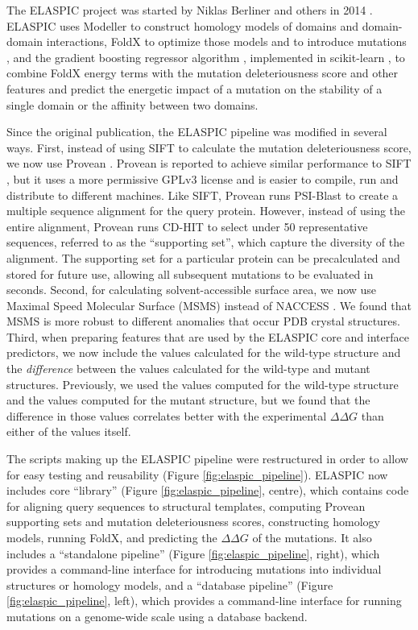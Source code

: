 The ELASPIC project was started by Niklas Berliner and others in 2014 \cite{berliner_combining_2014}. ELASPIC uses Modeller \cite{webb_comparative_2002} to construct homology models of domains and domain-domain interactions, FoldX to optimize those models and to introduce mutations \cite{schymkowitz_foldx_2005}, and the gradient boosting regressor algorithm \cite{berliner_combining_2014}, implemented in scikit-learn \cite{scikit-learn}, to combine FoldX energy terms with the mutation deleteriousness score and other features and predict the energetic impact of a mutation on the stability of a single domain or the affinity between two domains.

Since the original publication, the ELASPIC pipeline was modified in several ways. First, instead of using SIFT \cite{ng_sift:_2003} to calculate the mutation deleteriousness score, we now use Provean \cite{choi_predicting_2012}. Provean is reported to achieve similar performance to SIFT \cite{choi_predicting_2012}, but it uses a more permissive GPLv3 license and is easier to compile, run and distribute to different machines. Like SIFT, Provean runs PSI-Blast to create a multiple sequence alignment for the query protein. However, instead of using the entire alignment, Provean runs CD-HIT to select under 50 representative sequences, referred to as the ``supporting set'', which capture the diversity of the alignment. The supporting set for a particular protein can be precalculated and stored for future use, allowing all subsequent mutations to be evaluated in seconds. Second, for calculating solvent-accessible surface area, we now use Maximal Speed Molecular Surface (MSMS) \cite{sanner_fast_1995} instead of NACCESS \cite{hubbard_naccess_1993}. We found that MSMS is more robust to different anomalies that occur PDB crystal structures. Third, when preparing features that are used by the ELASPIC core and interface predictors, we now include the values calculated for the wild-type structure and the \textit{difference} between the values calculated for the wild-type and mutant structures. Previously, we used the values computed for the wild-type structure and the values computed for the mutant structure, but we found that the difference in those values correlates better with the experimental $\Delta \Delta G$ than either of the values itself.

The scripts making up the ELASPIC pipeline were restructured in order to allow for easy testing and reusability (Figure \ref{fig:elaspic_pipeline}). ELASPIC now includes core ``library'' (Figure \ref{fig:elaspic_pipeline}, centre), which contains code for aligning query sequences to structural templates, computing Provean supporting sets and mutation deleteriousness scores, constructing homology models, running FoldX, and predicting the $\Delta \Delta G$ of the mutations. It also includes a ``standalone pipeline'' (Figure \ref{fig:elaspic_pipeline}, right), which provides a command-line interface for introducing mutations into individual structures or homology models, and a ``database pipeline'' (Figure \ref{fig:elaspic_pipeline}, left), which provides a command-line interface for running mutations on a genome-wide scale using a database backend.

